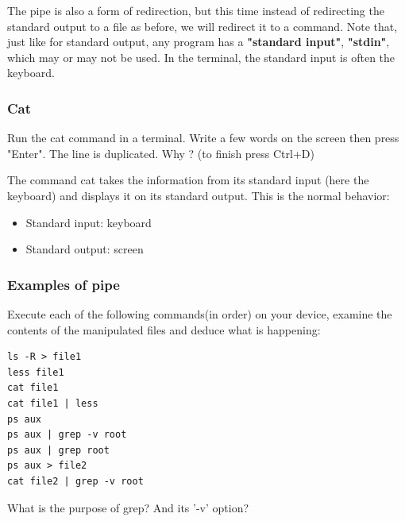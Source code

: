 \documentclass[11pt]{article}
\begin{document}
The pipe is also a form of redirection, but this time instead of redirecting the standard output to a file as before, we will redirect it to a command. Note that, just like for standard output, any program has a \textbf{"standard input"}, \textbf{"stdin"}, which may or may not be used. In the terminal, the standard input is often the keyboard.

\subsubsection{Cat}

Run the cat command in a terminal.
Write a few words on the screen then press "Enter".
The line is duplicated. Why ? (to finish press Ctrl+D)

\begin{solution}
	The command cat takes the information from its standard input (here the keyboard) and displays it on its standard output.
	This is the normal behavior:
	\begin{itemize}
		\item Standard input: keyboard
		\item Standard output: screen
	\end{itemize}
\end{solution}

\subsubsection{Examples of pipe}

Execute each of the following commands(in order) on your device, examine the contents of the manipulated files and deduce what is happening:

\begin{lstlisting}
ls -R > file1
less file1
cat file1
cat file1 | less
ps aux
ps aux | grep -v root
ps aux | grep root
ps aux > file2
cat file2 | grep -v root
\end{lstlisting}

 What is the purpose of grep? And its '-v' option?
\end{document}
